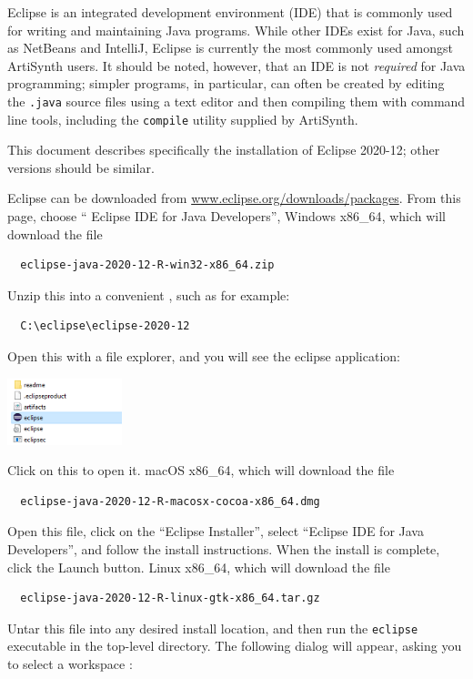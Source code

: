 Eclipse is an integrated development environment (IDE) that is
commonly used for writing and maintaining Java programs. While other
IDEs exist for Java, such as NetBeans and IntelliJ, Eclipse is
currently the most commonly used amongst ArtiSynth users. It should be
noted, however, that an IDE is not {\it required} for Java
programming; simpler programs, in particular, can often be created by
editing the {\tt .java} source files using a text editor and then
compiling them with command line tools, including the {\tt compile}
utility supplied by ArtiSynth.

This document describes specifically the installation of Eclipse
2020-12; other versions should be similar.

Eclipse can be downloaded from
\href{https://www.eclipse.org/downloads/packages}%
{www.eclipse.org/downloads/packages}. From this page, choose ``{\sf
Eclipse IDE for Java Developers}'',
\ifWindows
{\sf Windows x86\_64}, which will download the file
\begin{verbatim}
  eclipse-java-2020-12-R-win32-x86_64.zip
\end{verbatim}
Unzip this into a convenient \directory{}, such as for example:
\begin{verbatim}
  C:\eclipse\eclipse-2020-12
\end{verbatim}
Open this \directory{}with a file explorer, and you will see the eclipse
application:

\begin{center}
   \includegraphics[width=0.25\textwidth]{images/EclipseApp}
\end{center}

Click on this to open it. 
\fi
\ifMacOS
{\sf macOS x86\_64}, which will download the file
\begin{verbatim}
  eclipse-java-2020-12-R-macosx-cocoa-x86_64.dmg
\end{verbatim}
Open this file, click on the ``Eclipse Installer'',
select ``Eclipse IDE for Java Developers'', and follow
the install instructions. When the install is complete,
click the {\sf Launch} button.
\fi
\ifLinux
{\sf Linux x86\_64}, which will download the file
\begin{verbatim}
  eclipse-java-2020-12-R-linux-gtk-x86_64.tar.gz
\end{verbatim}
Untar this file into any desired install location,
and then run the {\tt eclipse} executable in the
top-level directory.
\fi
The following dialog will appear,
asking you to select a workspace \directory:


